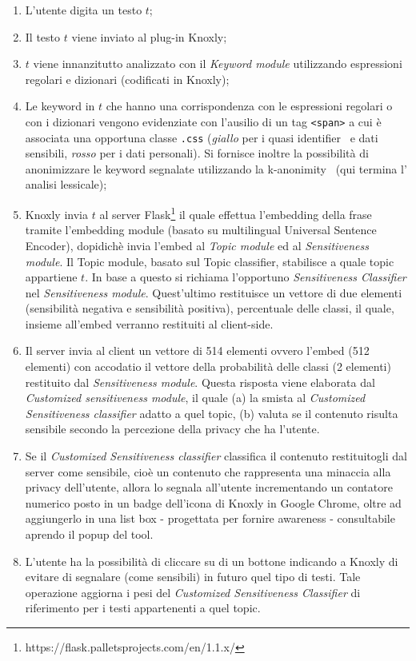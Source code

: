 \begin{enumerate}
    \item L'utente digita un testo $t$;
    \item Il testo $t$ viene inviato al plug-in Knoxly;
    \item $t$ viene innanzitutto analizzato con il \textit{Keyword module} utilizzando espressioni regolari e dizionari (codificati in Knoxly);
    \item Le keyword in $t$ che hanno una corrispondenza con le espressioni regolari o con i dizionari vengono evidenziate con l'ausilio di un tag {\tt <span>} a cui è associata una opportuna classe {\tt .css} (\textit{giallo} per i quasi identifier~\cite{} e dati sensibili, \textit{rosso} per i dati personali). Si fornisce inoltre la possibilità di anonimizzare le keyword segnalate utilizzando la k-anonimity~\cite{} (qui termina l' analisi lessicale);
    \item Knoxly invia $t$ al server Flask\footnote{https://flask.palletsprojects.com/en/1.1.x/} il quale effettua l'embedding della frase tramite l'embedding module (basato su multilingual Universal Sentence Encoder), dopidichè invia l'embed al \textit{Topic module} ed al \textit{Sensitiveness module}. Il Topic module, basato sul Topic classifier, stabilisce a quale topic appartiene $t$. In base a questo si richiama l'opportuno \textit{Sensitiveness Classifier} nel \textit{Sensitiveness module}. Quest'ultimo restituisce un vettore di due elementi (sensibilità negativa e sensibilità positiva), percentuale delle classi,  il quale, insieme all'embed verranno restituiti al client-side.
    \item Il server invia al client un vettore di 514 elementi ovvero l'embed (512 elementi) con accodatio il vettore della probabilità delle classi (2 elementi) restituito dal \textit{Sensitiveness module}. Questa risposta viene elaborata dal \textit{Customized sensitiveness module}, il quale (a) la smista al \textit{Customized Sensitiveness classifier} adatto a quel topic, (b) valuta se il contenuto risulta sensibile secondo la percezione della privacy che ha l'utente.
    \item Se il \textit{Customized Sensitiveness classifier} classifica il contenuto restituitogli dal server come sensibile, cioè un contenuto che rappresenta una minaccia alla privacy dell'utente, allora lo segnala all'utente incrementando un contatore numerico posto in un badge dell'icona di Knoxly in Google Chrome, oltre ad aggiungerlo in una list box - progettata per fornire awareness - consultabile aprendo il popup del tool.
    \item L'utente ha la possibilità di cliccare su di un bottone  indicando a Knoxly di evitare di segnalare (come sensibili) in futuro quel tipo di testi. Tale operazione aggiorna i pesi del \textit{Customized Sensitiveness Classifier} di riferimento per i testi appartenenti a quel topic.
\end{enumerate}

